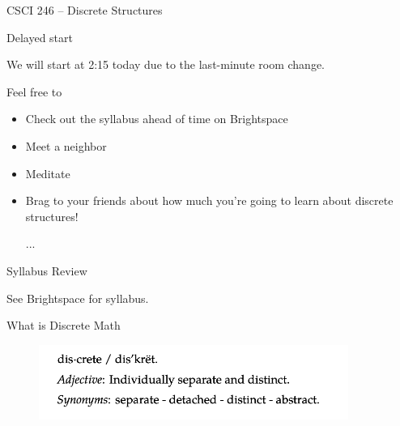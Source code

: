 \documentclass[t, aspectratio = 137, xcolor=dvipsnames,table,compress]{beamer}
\begin{document}
\date{Spring 2025}{}




\renewcommand{\insertframenumber}{}


\begin{frame}[plain,label=title-page, noframenumbering ]
  \titlepage
\end{frame}



\begin{frame}{CSCI 246 -- Discrete Structures}

 \begin{block}{Delayed start}
 
We will start at 2:15 today due to the last-minute room change.

\vspace{0.2cm}

Feel free to 
\begin{itemize}
\item Check out the syllabus ahead of time on Brightspace
\item Meet a neighbor
\item Meditate
\item Brag to your friends about how much you're going to learn about discrete structures!	
\item [...]
\end{itemize}

\end{block}
	
\end{frame}


\begin{frame}{Syllabus Review}

\Large \centering
\vfill 
See Brightspace for syllabus.

\end{frame}


\begin{frame}{What is Discrete Math}
\begin{figure}
\includegraphics[width=0.9\textwidth]{images/what_is_discrete_math}
\end{figure}
\end{frame}
\end{document}
